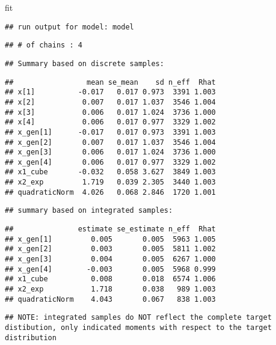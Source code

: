 \documentclass[
]{book}
\newenvironment{Shaded}{\begin{snugshade}}{\end{snugshade}}
\newcommand{\NormalTok}[1]{#1}
\begin{document}
\begin{Shaded}
\begin{Highlighting}[]
\NormalTok{fit}
\end{Highlighting}
\end{Shaded}

\begin{verbatim}
## run output for model: model
\end{verbatim}

\begin{verbatim}
## # of chains : 4
\end{verbatim}

\begin{verbatim}
## Summary based on discrete samples:
\end{verbatim}

\begin{verbatim}
##                 mean se_mean    sd n_eff  Rhat
## x[1]          -0.017   0.017 0.973  3391 1.003
## x[2]           0.007   0.017 1.037  3546 1.004
## x[3]           0.006   0.017 1.024  3736 1.000
## x[4]           0.006   0.017 0.977  3329 1.002
## x_gen[1]      -0.017   0.017 0.973  3391 1.003
## x_gen[2]       0.007   0.017 1.037  3546 1.004
## x_gen[3]       0.006   0.017 1.024  3736 1.000
## x_gen[4]       0.006   0.017 0.977  3329 1.002
## x1_cube       -0.032   0.058 3.627  3849 1.003
## x2_exp         1.719   0.039 2.305  3440 1.003
## quadraticNorm  4.026   0.068 2.846  1720 1.001
\end{verbatim}

\begin{verbatim}
## summary based on integrated samples:
\end{verbatim}

\begin{verbatim}
##               estimate se_estimate n_eff  Rhat
## x_gen[1]         0.005       0.005  5963 1.005
## x_gen[2]         0.003       0.005  5811 1.002
## x_gen[3]         0.004       0.005  6267 1.000
## x_gen[4]        -0.003       0.005  5968 0.999
## x1_cube          0.008       0.018  6574 1.006
## x2_exp           1.718       0.038   989 1.003
## quadraticNorm    4.043       0.067   838 1.003
\end{verbatim}

\begin{verbatim}
## NOTE: integrated samples do NOT reflect the complete target distibution, only indicated moments with respect to the target distribution
\end{verbatim}
\end{document}
